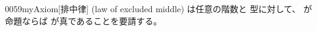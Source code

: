 \documentclass[index]{subfiles}
\begin{document}
\begin{myBlock}{0059}{myAxiom}[排中律]
  (law of excluded middle)
  は任意の階数と
  型に対して、
  が命題ならば
  が真であることを要請する。
\end{myBlock}
\end{document}
